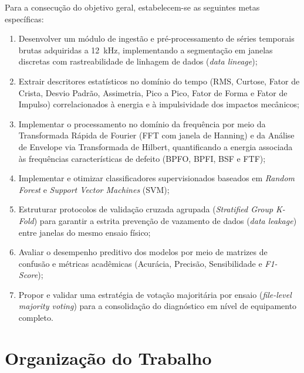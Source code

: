Para a consecução do objetivo geral, estabelecem-se as seguintes metas específicas:
\begin{enumerate}
    \item Desenvolver um módulo de ingestão e pré-processamento de séries temporais brutas adquiridas a \SI{12}{\kilo\hertz}, implementando a segmentação em janelas discretas com rastreabilidade de linhagem de dados (\textit{data lineage});
    \item Extrair descritores estatísticos no domínio do tempo (RMS, Curtose, Fator de Crista, Desvio Padrão, Assimetria, Pico a Pico, Fator de Forma e Fator de Impulso) correlacionados à energia e à impulsividade dos impactos mecânicos;
    \item Implementar o processamento no domínio da frequência por meio da Transformada Rápida de Fourier (FFT com janela de Hanning) e da Análise de Envelope via Transformada de Hilbert, quantificando a energia associada às frequências características de defeito (BPFO, BPFI, BSF e FTF);
    \item Implementar e otimizar classificadores supervisionados baseados em \textit{Random Forest} e \textit{Support Vector Machines} (SVM);
    \item Estruturar protocolos de validação cruzada agrupada (\textit{Stratified Group K-Fold}) para garantir a estrita prevenção de vazamento de dados (\textit{data leakage}) entre janelas do mesmo ensaio físico;
    \item Avaliar o desempenho preditivo dos modelos por meio de matrizes de confusão e métricas acadêmicas (Acurácia, Precisão, Sensibilidade e \textit{F1-Score});
    \item Propor e validar uma estratégia de votação majoritária por ensaio (\textit{file-level majority voting}) para a consolidação do diagnóstico em nível de equipamento completo.
\end{enumerate}

\section{Organização do Trabalho}
\label{sec:organizacao}

